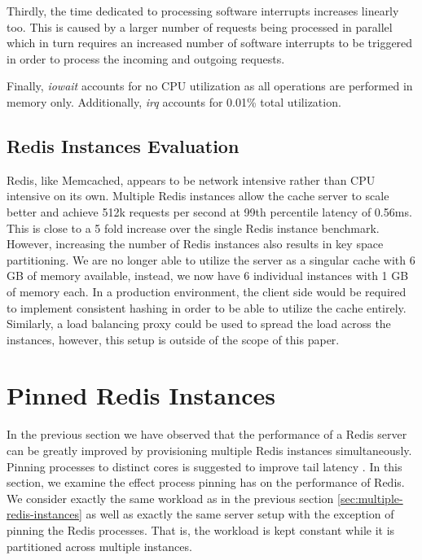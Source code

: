 Thirdly, the time dedicated to processing software interrupts increases linearly too. This is caused by a larger number of requests being processed in parallel which in turn requires an increased number of software interrupts to be triggered in order to process the incoming and outgoing requests.

Finally, \textit{iowait} accounts for no CPU utilization as all operations are performed in memory only. Additionally, \textit{irq} accounts for 0.01\% total utilization.

\subsection{Redis Instances Evaluation}

Redis, like Memcached, appears to be network intensive rather than CPU intensive on its own. Multiple Redis instances allow the cache server to scale better and achieve 512k requests per second at 99th percentile latency of 0.56ms. This is close to a 5 fold increase over the single Redis instance benchmark. However, increasing the number of Redis instances also results in key space partitioning. We are no longer able to utilize the server as a singular cache with 6 GB of memory available, instead, we now have 6 individual instances with 1 GB of memory each. In a production environment, the client side would be required to implement consistent hashing in order to be able to utilize the cache entirely. Similarly, a load balancing proxy could be used to spread the load across the instances, however, this setup is outside of the scope of this paper.


\section{Pinned Redis Instances}

In the previous section we have observed that the performance of a Redis server can be greatly improved by provisioning multiple Redis instances simultaneously. Pinning processes to distinct cores is suggested to improve tail latency \cite{leverich2014reconciling}. In this section, we examine the effect process pinning has on the performance of Redis. We consider exactly the same workload as in the previous section \ref{sec:multiple-redis-instances} as well as exactly the same server setup with the exception of pinning the Redis processes. That is, the workload is kept constant while it is partitioned across multiple instances.

